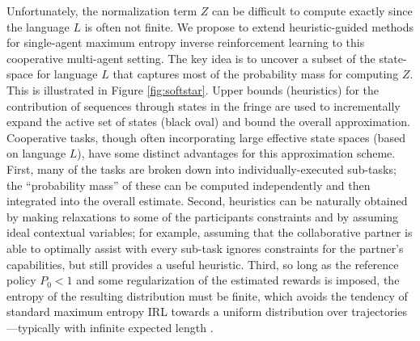 \documentclass[letterpaper, 11 pt, onecolumn]{article}
\begin{document}
Unfortunately, the normalization term $Z$ can be difficult to compute exactly since the language $L$ is often not finite.
We propose to extend heuristic-guided methods for single-agent maximum entropy inverse reinforcement learning \cite{monfort2015softstar} to this cooperative multi-agent setting.
The key idea is to uncover a subset of the state-space for language $L$ that captures most of the probability mass for computing $Z$.
This is illustrated in Figure \ref{fig:softstar}. Upper bounds (heuristics) for the contribution of sequences through states in the fringe are used to incrementally expand the active set of states (black oval) and bound the overall approximation.
Cooperative tasks, though often incorporating large effective state  spaces (based on language $L$), have some distinct advantages for this approximation scheme.
First, many of the tasks are broken down into individually-executed sub-tasks; the ``probability mass'' of these can be computed independently and then integrated into the overall estimate.
Second, heuristics can be naturally obtained by making relaxations to some of the participants constraints and by assuming ideal contextual variables; for example, assuming that the collaborative partner is able to optimally assist with every sub-task ignores constraints for the partner's capabilities, but still provides a useful heuristic.
Third, so long as the reference policy $P_0 < 1$ and some regularization of the estimated rewards is imposed, the entropy of the resulting distribution must be finite, which avoids the tendency of standard maximum entropy IRL towards a uniform distribution over trajectories---typically with infinite expected length \cite{ziebart2010modeling}.


\end{document}

